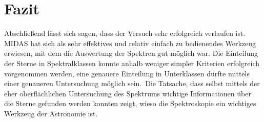 \section{Fazit}
Abschließend lässt sich sagen, dass der Versuch sehr erfolgreich verlaufen ist. MIDAS hat sich als sehr effektives und relativ einfach zu bedienendes Werkzeug erwiesen, mit dem die Auswertung der Spektren gut möglich war. Die Einteilung der Sterne in Spektralklassen konnte anhalb weniger simpler Kriterien erfolgreich vorgenommen werden, eine genauere Einteilung in Unterklassen dürfte mittels einer genaueren Untersuchung möglich sein.\
Die Tatsache, dass selbst mittels der eher oberflächlichen Untersuchung des Spektrums wichtige Informationen über die Sterne gefunden werden konnten zeigt, wieso die Spektroskopie ein wichtiges Werkzeug der Astronomie ist.